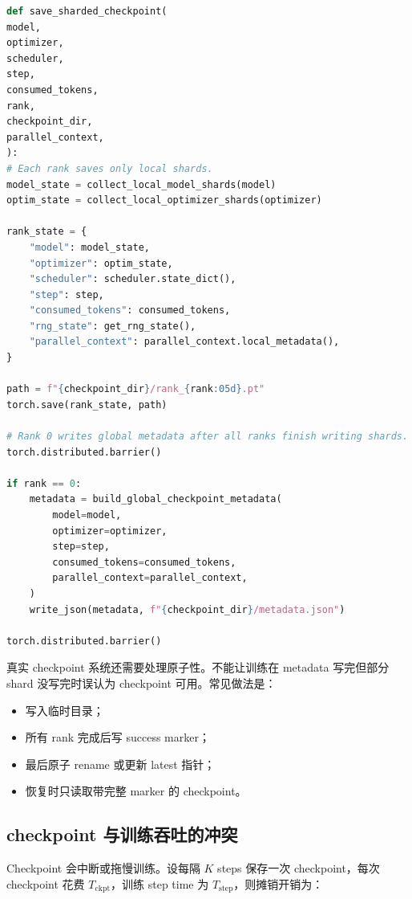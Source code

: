 \begin{lstlisting}[language=Python,caption={保存模型与优化器 shard 的简化伪代码},label={lst:save-sharded-checkpoint-pseudocode}]
def save_sharded_checkpoint(
model,
optimizer,
scheduler,
step,
consumed_tokens,
rank,
checkpoint_dir,
parallel_context,
):
# Each rank saves only local shards.
model_state = collect_local_model_shards(model)
optim_state = collect_local_optimizer_shards(optimizer)

rank_state = {
    "model": model_state,
    "optimizer": optim_state,
    "scheduler": scheduler.state_dict(),
    "step": step,
    "consumed_tokens": consumed_tokens,
    "rng_state": get_rng_state(),
    "parallel_context": parallel_context.local_metadata(),
}

path = f"{checkpoint_dir}/rank_{rank:05d}.pt"
torch.save(rank_state, path)

# Rank 0 writes global metadata after all ranks finish writing shards.
torch.distributed.barrier()

if rank == 0:
    metadata = build_global_checkpoint_metadata(
        model=model,
        optimizer=optimizer,
        step=step,
        consumed_tokens=consumed_tokens,
        parallel_context=parallel_context,
    )
    write_json(metadata, f"{checkpoint_dir}/metadata.json")

torch.distributed.barrier()

\end{lstlisting}

真实 checkpoint 系统还需要处理原子性。不能让训练在 metadata 写完但部分 shard 没写完时误认为 checkpoint 可用。常见做法是：

\begin{itemize}
\item 写入临时目录；
\item 所有 rank 完成后写 success marker；
\item 最后原子 rename 或更新 latest 指针；
\item 恢复时只读取带完整 marker 的 checkpoint。
\end{itemize}

\subsection{checkpoint 与训练吞吐的冲突}
\label{subsec:checkpoint-vs-throughput}

Checkpoint 会中断或拖慢训练。设每隔 $K$ steps 保存一次 checkpoint，每次 checkpoint 花费 $T_{\mathrm{ckpt}}$，训练 step time 为 $T_{\mathrm{step}}$，则摊销开销为：

